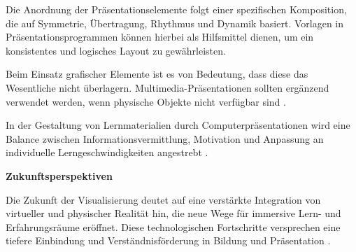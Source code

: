 Die Anordnung der Präsentationselemente folgt einer spezifischen Komposition, die auf Symmetrie, Übertragung, Rhythmus und Dynamik basiert. Vorlagen in Präsentationsprogrammen können hierbei als Hilfsmittel dienen, um ein konsistentes und logisches Layout zu gewährleisten.

Beim Einsatz grafischer Elemente ist es von Bedeutung, dass diese das Wesentliche nicht überlagern. Multimedia-Präsentationen sollten ergänzend verwendet werden, wenn physische Objekte nicht verfügbar sind \cite{Urbanova2008}.

In der Gestaltung von Lernmaterialien durch Computerpräsentationen wird eine Balance zwischen Informationsvermittlung, Motivation und Anpassung an individuelle Lerngeschwindigkeiten angestrebt \cite{Vermirovsky2010}.

\textbf{Zukunftsperspektiven}

Die Zukunft der Visualisierung deutet auf eine verstärkte Integration von virtueller und physischer Realität hin, die neue Wege für immersive Lern- und Erfahrungsräume eröffnet. Diese technologischen Fortschritte versprechen eine tiefere Einbindung und Verständnisförderung in Bildung und Präsentation \cite{Vermirovsky2010ImportanceVisualisation}.


